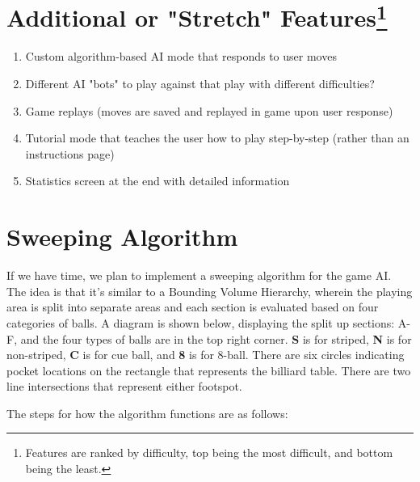 \documentclass[12pt]{article}
\begin{document}
\section{Additional or "Stretch" Features\protect\footnote{ Features are ranked by difficulty, top being the most difficult, and bottom being the least.}}

\begin{enumerate}
\item Custom algorithm-based AI mode that responds to user moves
    \item Different AI "bots" to play against that play with different difficulties?
    \item Game replays (moves are saved and replayed in game upon user response)
\item Tutorial mode that teaches the user how to play step-by-step (rather than an instructions page)
\item Statistics screen at the end with detailed information
\end{enumerate}

\section{Sweeping Algorithm}
If we have time, we plan to implement a sweeping algorithm for the game AI. The idea is that it's similar to a Bounding Volume Hierarchy, wherein the playing area is split into separate areas and each section is evaluated based on four categories of balls. A diagram is shown below, displaying the split up sections: A-F, and the four types of balls are in the top right corner. \textbf{S} is for striped, \textbf{N} is for non-striped, \textbf{C} is for cue ball, and \textbf{8} is for 8-ball. There are six circles indicating pocket locations on the rectangle that represents the billiard table. There are two line intersections that represent either footspot.

The steps for how the algorithm functions are as follows:
\end{document}
